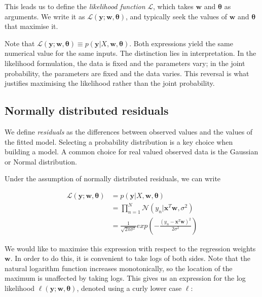 \documentclass[11pt]{article}
\begin{document}
	This leads us to define the \emph{likelihood function} \( \mathcal{L} \), which takes \( \boldsymbol{w} \) and \( \boldsymbol{\theta} \) as arguments. We write it as \( \mathcal{L}(\boldsymbol{y}; \boldsymbol{w}, \boldsymbol{\theta}) \), and typically seek the values of \( \boldsymbol{w} \) and \( \boldsymbol{\theta} \) that maximise it.
	
	Note that \( \mathcal{L}(\boldsymbol{y}; \boldsymbol{w}, \boldsymbol{\theta}) \equiv p(\boldsymbol{y} | X, \boldsymbol{w}, \boldsymbol{\theta}) \). Both expressions yield the same numerical value for the same inputs. The distinction lies in interpretation. In the likelihood formulation, the data is fixed and the parameters vary; in the joint probability, the parameters are fixed and the data varies. This reversal is what justifies maximising the likelihood rather than the joint probability.
	
	\subsection{Normally distributed residuals}
	
	We define \emph{residuals} as the differences between observed values and the values of the fitted model. Selecting a probability distribution is a key choice when building a model. A common choice for real valued observed data is the Gaussian or Normal distribution.
	
	Under the assumption of normally distributed residuals, we can write
	
	\begin{align*}
		\mathcal{L}(\boldsymbol{y}; \boldsymbol{w}, \boldsymbol{\theta}) &= p(\boldsymbol{y} | X, \boldsymbol{w}, \boldsymbol{\theta}) \\
		&= \prod_{n=1}^{N} \mathcal{N}(y_{n} | \boldsymbol{x}^{T}\boldsymbol{w}, \sigma^{2}) \\
		&= \frac{1}{\sqrt{2\pi\sigma^{2}}}exp\left(-\frac{(y_{n} - \boldsymbol{x}^{T}\boldsymbol{w})^{2}}{2\sigma^{2}}\right)	
	\end{align*}
	
	We would like to maximise this expression with respect to the regression weights $\boldsymbol{w}$. In order to do this, it is convenient to take logs of both sides. Note that the natural logarithm function increases monotonically, so the location of the maximum is unaffected by taking logs. This gives us an expression for the log likelihood $\ell(\boldsymbol{y}; \boldsymbol{w}, \boldsymbol{\theta})$, denoted using a curly lower case $\ell$:
	
\end{document}
